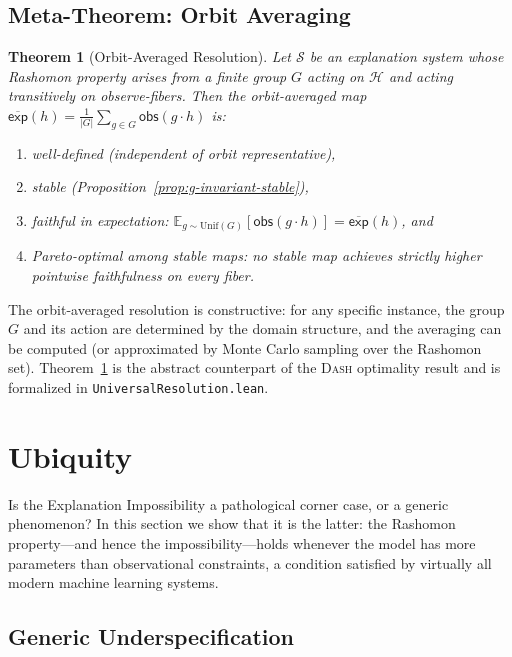\documentclass{article}
\newtheorem{theorem}{Theorem}
\newcommand{\E}{\mathbb{E}}
\newcommand{\DASH}{\textsc{Dash}}
\newcommand{\sH}{\mathcal{H}}
\begin{document}
\subsection{Meta-Theorem: Orbit Averaging}
\label{sec:meta-theorem}

\begin{theorem}[Orbit-Averaged Resolution]
\label{thm:orbit-average}
Let $\mathcal{S}$ be an explanation system whose Rashomon property arises
from a finite group $G$ acting on $\sH$ and acting transitively on
observe-fibers.  Then the orbit-averaged map
$\overline{\mathsf{exp}}(h) = \frac{1}{|G|}\sum_{g \in G}\mathsf{obs}(g \cdot h)$
is:
\begin{enumerate}
  \item well-defined (independent of orbit representative),
  \item stable (Proposition~\ref{prop:g-invariant-stable}),
  \item faithful in expectation: $\E_{g \sim \mathrm{Unif}(G)}[\mathsf{obs}(g \cdot h)] = \overline{\mathsf{exp}}(h)$, and
  \item Pareto-optimal among stable maps: no stable map achieves strictly
    higher pointwise faithfulness on every fiber.
\end{enumerate}
\end{theorem}

\noindent
The orbit-averaged resolution is constructive: for any specific instance, the
group $G$ and its action are determined by the domain structure, and the
averaging can be computed (or approximated by Monte Carlo sampling over the
Rashomon set).  Theorem~\ref{thm:orbit-average} is the abstract counterpart
of the \DASH{} optimality result and is formalized in
\texttt{UniversalResolution.lean}.

\section{Ubiquity}
\label{sec:ubiquity}

Is the Explanation Impossibility a pathological corner case, or a
generic phenomenon?  In this section we show that it is the latter: the
Rashomon property---and hence the impossibility---holds whenever the model
has more parameters than observational constraints, a condition satisfied by
virtually all modern machine learning systems.

\subsection{Generic Underspecification}
\label{sec:generic-underspec}
\end{document}
